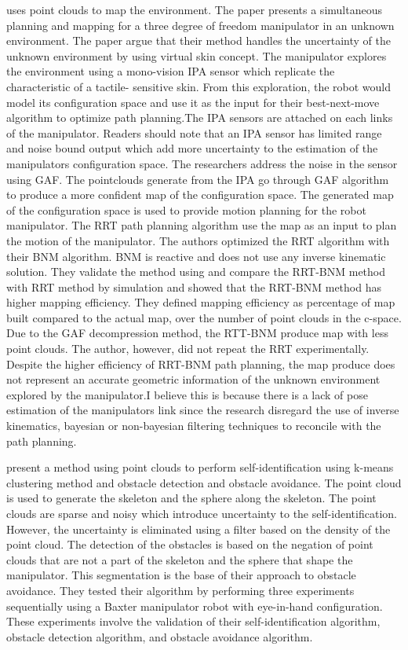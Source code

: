 \textcite{Um2013} uses point clouds to map the environment. The paper presents a
simultaneous planning and mapping for a three degree of freedom manipulator in an unknown
environment. The paper argue that their method handles the uncertainty of the unknown
environment by using virtual skin concept. The manipulator explores the environment using a
mono-vision \acrfull{IPA} sensor which replicate the characteristic of a tactile-
sensitive skin. From this exploration, the robot would model its configuration space
and use it as the input for their best-next-move algorithm to optimize path planning.The IPA
sensors are attached on each links of the manipulator. Readers should note that an IPA sensor
has limited range and noise bound output which add more uncertainty to the estimation of the
manipulators configuration space. The researchers address the noise in the sensor using \acrfull{GAF}. The pointclouds generate from the IPA go through GAF algorithm to produce a
more confident map of the configuration space. The generated map of the configuration space is used to provide
motion planning for the robot manipulator. The RRT path
planning algorithm use the map as an input to plan the motion of the manipulator. The authors
optimized the RRT algorithm with their \acrfull{BNM} algorithm. BNM is reactive and
does not use any inverse kinematic solution. They validate the method using and compare the
RRT-BNM method with RRT method by simulation and showed that the RRT-BNM method has
higher mapping efficiency. They defined mapping efficiency as percentage of map built
compared to the actual map, over the number of point clouds in the c-space. Due to the GAF
decompression method, the RTT-BNM produce map with less point clouds.
The author, however, did not repeat the RRT experimentally. 
Despite the higher efficiency of RRT-BNM path planning, the map produce does not represent an accurate geometric
information of the unknown environment explored by the manipulator.I believe this is
because there is a lack of pose estimation of the manipulators link since the research disregard
the use of inverse kinematics, bayesian or non-bayesian filtering techniques to reconcile with
the path planning.

\textcite{Wang2017} present a method using point clouds to perform self-identification
using k-means clustering method and obstacle detection and obstacle avoidance. The point
cloud is used to generate the skeleton and the sphere along the skeleton. The point clouds are
sparse and noisy which introduce uncertainty to the self-identification. However, the uncertainty
is eliminated using a filter based on the density of the point cloud. The detection of the obstacles
is based on the negation of point clouds that are not a part of the skeleton and the sphere that
shape the manipulator. This segmentation is the base of their approach to obstacle avoidance.
They tested their algorithm by performing three experiments sequentially using a Baxter
manipulator robot with eye-in-hand configuration. These experiments involve the validation of
their self-identification algorithm, obstacle detection algorithm, and obstacle avoidance
algorithm.


